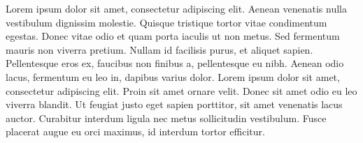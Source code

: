 Lorem ipsum dolor sit amet, consectetur adipiscing elit. Aenean venenatis nulla vestibulum dignissim molestie. Quisque tristique tortor vitae condimentum egestas. Donec vitae odio et quam porta iaculis ut non metus. Sed fermentum mauris non viverra pretium. Nullam id facilisis purus, et aliquet sapien. Pellentesque eros ex, faucibus non finibus a, pellentesque eu nibh. Aenean odio lacus, fermentum eu leo in, dapibus varius dolor. Lorem ipsum dolor sit amet, consectetur adipiscing elit. Proin sit amet ornare velit. Donec sit amet odio eu leo viverra blandit. Ut feugiat justo eget sapien porttitor, sit amet venenatis lacus auctor. Curabitur interdum ligula nec metus sollicitudin vestibulum. Fusce placerat augue eu orci maximus, id interdum tortor efficitur.